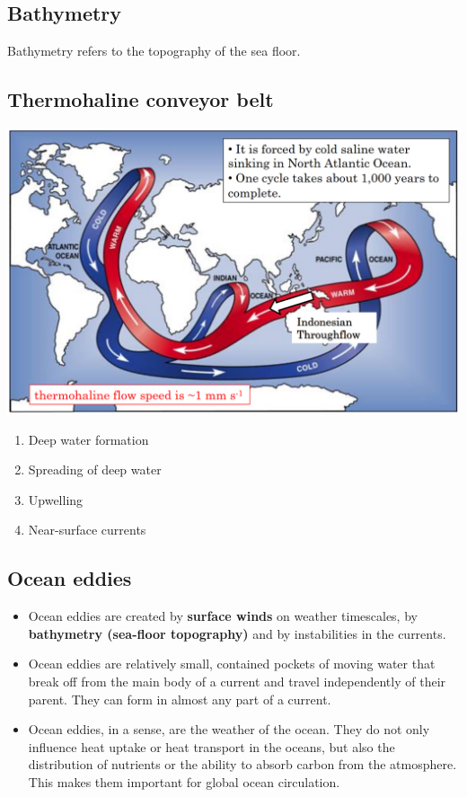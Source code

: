 \documentclass[11pt]{article}
\begin{document}
\subsection{Bathymetry}
\label{sec:org9b79fb8}
Bathymetry refers to the topography of the sea floor.

\subsection{Thermohaline conveyor belt}
\label{sec:org0387dc5}
\begin{center}
\includegraphics[width=.9\linewidth]{./images/thermohaline-conveyor-belt.png}
\end{center}

\begin{enumerate}
\item Deep water formation
\item Spreading of deep water
\item Upwelling
\item Near-surface currents
\end{enumerate}

\subsection{Ocean eddies}
\label{sec:org7101057}
\begin{itemize}
\item Ocean eddies are created by \textbf{surface winds} on weather timescales, by \textbf{bathymetry (sea-floor topography)} and by instabilities in the currents.
\item Ocean eddies are relatively small, contained pockets of moving water that break off from the main body of a current and travel independently of their parent. They can form in almost any part of a current.
\item Ocean eddies, in a sense, are the weather of the ocean. They do not only influence heat uptake or heat transport in the oceans, but also the distribution of nutrients or the ability to absorb carbon from the atmosphere. This makes them important for global ocean circulation.
\end{itemize}
\end{document}
